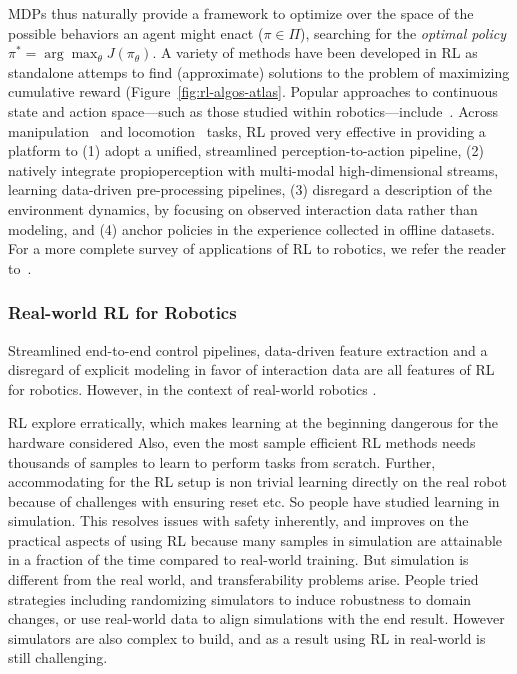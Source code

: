 MDPs thus naturally provide a framework to optimize over the space of the possible behaviors an agent might enact (\( \pi \in \Pi \)), searching for the \emph{optimal policy} \( \pi^* = \arg \max_{\theta} J(\pi_\theta) \).
A variety of methods have been developed in RL as standalone attemps to find (approximate) solutions to the problem of maximizing cumulative reward (Figure~\ref{fig:rl-algos-atlas}.
Popular approaches to continuous state and action space---such as those studied within robotics---include~\citet{schulmanTrustRegionPolicy2017, schulmanProximalPolicyOptimization2017, haarnojaSoftActorCriticOffPolicy2018}.
Across manipulation~\citep{openaiSolvingRubiksCube2019} and locomotion~\citep{leeLearningQuadrupedalLocomotion2020} tasks, RL proved very effective in providing a platform to (1) adopt a unified, streamlined perception-to-action pipeline, (2) natively integrate propioperception with multi-modal high-dimensional streams, learning data-driven pre-processing pipelines, (3) disregard a description of the environment dynamics, by focusing on observed interaction data rather than modeling, and (4) anchor policies in the experience collected in offline datasets.
For a more complete survey of applications of RL to robotics, we refer the reader to~\citet{koberReinforcementLearningRobotics,tangDeepReinforcementLearning2025a}.

\subsubsection{Real-world RL for Robotics}
Streamlined end-to-end control pipelines, data-driven feature extraction and a disregard of explicit modeling in favor of interaction data are all features of RL for robotics.
However, in the context of real-world robotics .

RL explore erratically, which makes learning at the beginning dangerous for the hardware considered
Also, even the most sample efficient RL methods needs thousands of samples to learn to perform tasks from scratch. Further, accommodating for the RL setup is non trivial learning directly on the real robot because of challenges with ensuring reset etc.
So people have studied learning in simulation. This resolves issues with safety inherently, and improves on the practical aspects of using RL because many samples in simulation are attainable in a fraction of the time compared to real-world training. 
But simulation is different from the real world, and transferability problems arise.
People tried strategies including randomizing simulators to induce robustness to domain changes, or use real-world data to align simulations with the end result.
However simulators are also complex to build, and as a result using RL in real-world is still challenging.

